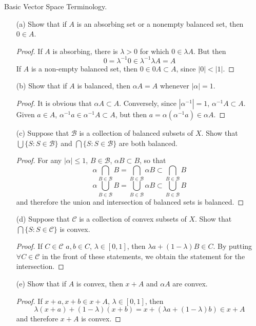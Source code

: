 \begin{exercise}
    Basic Vector Space Terminology.
    \begin{enumerate}
        \item[(a)] Show that if $A$ is an absorbing set or a nonempty balanced set, then $0 \in A$.
        \begin{proof}
            If $A$ is absorbing, there is $\lambda > 0$ for which $0 \in \lambda A$. But then
            \[ 0 = \lambda^{-1} 0 \in \lambda^{-1} \lambda A = A \]
            If $A$ is a non-empty balanced set, then $0 \in 0 A \subset A$, since $|0| < |1|$.
        \end{proof}

        \item[(b)] Show that if $A$ is balanced, then $\alpha A = A$ whenever $|\alpha| = 1$.
        \begin{proof}
            It is obvious that $\alpha A \subset A$. Conversely, since $|\alpha^{-1}| = 1$, $\alpha^{-1} A \subset A$. Given $a \in A$, $\alpha^{-1} a \in \alpha^{-1} A \subset A$, but then $a = \alpha(\alpha^{-1} a) \in \alpha A$.
        \end{proof}

        \item[(c)] Suppose that $\mathcal{B}$ is a collection of balanced subsets of $X$. Show that $\bigcup \{ S : S \in \mathcal{B} \}$ and $\bigcap \{ S : S \in \mathcal{B} \}$ are both balanced.
        \begin{proof}
            For any $|\alpha| \leq 1$, $B \in \mathcal{B}$, $\alpha B \subset B$, so that
            \[ \alpha \bigcap_{B \in \mathcal{B}} B = \bigcap_{B \in \mathcal{B}} \alpha B \subset \bigcap_{B \in \mathcal{B}} B \]
            \[ \alpha \bigcup_{B \in \mathcal{B}} B = \bigcup_{B \in \mathcal{B}} \alpha B \subset \bigcup_{B \in \mathcal{B}} B \]
            and therefore the union and intersection of balanced sets is balanced.
        \end{proof}

        \item[(d)] Suppose that $\mathcal{C}$ is a collection of convex subsets of $X$. Show that $\bigcap \{ S : S \in \mathcal{C} \}$ is convex.
        \begin{proof}
            If $C \in \mathcal{C}$ $a, b \in C$, $\lambda \in [0,1]$, then $\lambda a + (1 - \lambda) B \in C$. By putting $\forall C \in \mathcal{C}$ in the front of these statements, we obtain the statement for the intersection.
        \end{proof}

        \item[(e)] Show that if $A$ is convex, then $x + A$ and $\alpha A$ are convex.
        \begin{proof}
            If $x + a, x + b \in x + A$, $\lambda \in [0,1]$, then
            \[ \lambda (x + a) + (1 - \lambda) (x + b) = x + (\lambda a + (1 - \lambda) b) \in x + A \]
            and therefore $x + A$ is convex.
        \end{proof}
    \end{enumerate}
\end{exercise}


